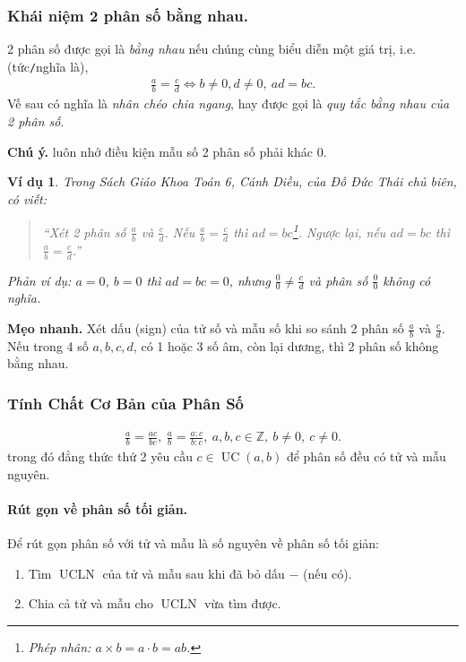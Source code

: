 \documentclass{article}
\numberwithin{equation}{section}
\newtheorem{example}{Ví dụ}[section]
\begin{document}
\subsubsection{Khái niệm 2 phân số bằng nhau.} 2 phân số được gọi là \textit{bằng nhau} nếu chúng cùng biểu diễn một giá trị, i.e. (tức\texttt{/}nghĩa là),
\begin{align}
	\boxed{\frac{a}{b} = \frac{c}{d}\Leftrightarrow b\ne 0, d\ne 0,\ ad = bc.}
\end{align}
Vế sau có nghĩa là \textit{nhân chéo chia ngang}, hay được gọi là \textit{quy tắc bằng nhau của 2 phân số}.

\textbf{Chú ý.} luôn nhớ điều kiện mẫu số 2 phân số phải khác 0.

\begin{example}
	Trong Sách Giáo Khoa Toán 6, Cánh Diều, của Đỗ Đức Thái chủ biên, có viết:
	\begin{quotation}
		``Xét 2 phân số $\frac{a}{b}$ và $\frac{c}{d}$. Nếu $\frac{a}{b} = \frac{c}{d}$ thì $ad = bc$\footnote{Phép nhân: $a\times b = a\cdot b = ab$.}. Ngược lại, nếu $ad = bc$ thì $\frac{a}{b} = \frac{c}{d}$.''
	\end{quotation}
	Phản ví dụ: $a = 0$, $b = 0$ thì $ad = bc = 0$, nhưng $\frac{0}{0}\ne\frac{c}{d}$ và phân số $\frac{0}{0}$ không có nghĩa.
\end{example}
\textbf{Mẹo nhanh.} Xét dấu (sign) của tử số và mẫu số khi so sánh 2 phân số $\frac{a}{b}$ và $\frac{c}{d}$. Nếu trong 4 số $a,b,c,d$, có 1 hoặc 3 số âm, còn lại dương, thì 2 phân số không bằng nhau.

\subsubsection{Tính Chất Cơ Bản của Phân Số}
\begin{align}
	\boxed{\frac{a}{b} = \frac{ac}{bc},\ \frac{a}{b} = \frac{a:c}{b:c},\ a,b,c\in\mathbb{Z},\ b\ne 0,\ c\ne 0.}
\end{align}
trong đó đẳng thức thứ 2 yêu cầu $c\in\operatorname{UC}(a,b)$ để phân số đều có tử và mẫu nguyên.

\paragraph{Rút gọn về phân số tối giản.}
Để rút gọn phân số với tử và mẫu là số nguyên về phân số tối giản:
\begin{enumerate}
	\item Tìm $\operatorname{UCLN}$ của tử và mẫu sau khi đã bỏ dấu $-$ (nếu có).
	\item Chia cả tử và mẫu cho $\operatorname{UCLN}$ vừa tìm được.
\end{enumerate}
\end{document}
